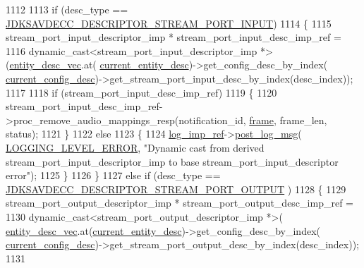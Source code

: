 \begin{DoxyCode}
{{1112 
1113         \textcolor{keywordflow}{if} (desc\_type == \hyperlink{group__descriptor_gabf97c9389e49a8c27f2192854f830eda}{JDKSAVDECC\_DESCRIPTOR\_STREAM\_PORT\_INPUT})
1114         \{
1115             stream\_port\_input\_descriptor\_imp * stream\_port\_input\_desc\_imp\_ref =
1116                 \textcolor{keyword}{dynamic\_cast<}stream\_port\_input\_descriptor\_imp *\textcolor{keyword}{>}(\hyperlink{classavdecc__lib_1_1end__station__imp_a72edab41bc56e3c1757944a7df188a3d}{entity\_desc\_vec}.at(
      \hyperlink{classavdecc__lib_1_1end__station__imp_afd78c89df26ba7641e1adb764c0e827d}{current\_entity\_desc})->get\_config\_desc\_by\_index(
      \hyperlink{classavdecc__lib_1_1end__station__imp_a60b1af40d35e8a86b0082c54ab6cb6a8}{current\_config\_desc})->get\_stream\_port\_input\_desc\_by\_index(desc\_index));
1117 
1118             \textcolor{keywordflow}{if} (stream\_port\_input\_desc\_imp\_ref)
1119             \{
1120                 stream\_port\_input\_desc\_imp\_ref->proc\_remove\_audio\_mappings\_resp(notification\_id, 
      \hyperlink{gst__avb__playbin_8c_ac8e710e0b5e994c0545d75d69868c6f0}{frame}, frame\_len, status);
1121             \}
1122             \textcolor{keywordflow}{else}
1123             \{
1124                 \hyperlink{namespaceavdecc__lib_acbe3e2a96ae6524943ca532c87a28529}{log\_imp\_ref}->\hyperlink{classavdecc__lib_1_1log_a68139a6297697e4ccebf36ccfd02e44a}{post\_log\_msg}(
      \hyperlink{namespaceavdecc__lib_a501055c431e6872ef46f252ad13f85cdaf2c4481208273451a6f5c7bb9770ec8a}{LOGGING\_LEVEL\_ERROR}, \textcolor{stringliteral}{"Dynamic cast from derived stream\_port\_input\_descriptor\_imp to base
       stream\_port\_input\_descriptor error"});
1125             \}
1126         \}
1127         \textcolor{keywordflow}{else} \textcolor{keywordflow}{if} (desc\_type == \hyperlink{group__descriptor_gab28f87a9e7610f8441c1c4840d2c2fb9}{JDKSAVDECC\_DESCRIPTOR\_STREAM\_PORT\_OUTPUT}
      )
1128         \{
1129             stream\_port\_output\_descriptor\_imp * stream\_port\_output\_desc\_imp\_ref =
1130                 \textcolor{keyword}{dynamic\_cast<}stream\_port\_output\_descriptor\_imp *\textcolor{keyword}{>}(
      \hyperlink{classavdecc__lib_1_1end__station__imp_a72edab41bc56e3c1757944a7df188a3d}{entity\_desc\_vec}.at(\hyperlink{classavdecc__lib_1_1end__station__imp_afd78c89df26ba7641e1adb764c0e827d}{current\_entity\_desc})->get\_config\_desc\_by\_index(
      \hyperlink{classavdecc__lib_1_1end__station__imp_a60b1af40d35e8a86b0082c54ab6cb6a8}{current\_config\_desc})->get\_stream\_port\_output\_desc\_by\_index(desc\_index));
1131 
}}
\end{DoxyCode}
